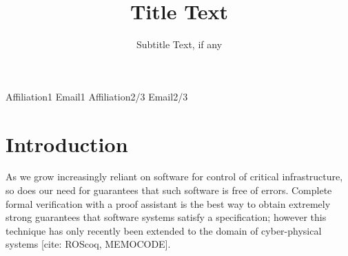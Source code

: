\documentclass{sigplanconf}
\begin{document}
\setlength{\pdfpageheight}{\paperheight}
\setlength{\pdfpagewidth}{\paperwidth}






\title{Title Text}
\subtitle{Subtitle Text, if any}

           {Affiliation1}
           {Email1}
           {Affiliation2/3}
           {Email2/3}

\maketitle





\section{Introduction}          %

As we grow increasingly reliant on software for control of critical infrastructure, so does our need for guarantees that such software is free of errors. Complete formal verification with a proof assistant is the best way to obtain extremely strong guarantees that software systems satisfy a specification; however this technique has only recently been extended to the domain of cyber-physical systems [cite: ROScoq, MEMOCODE]. %
\end{document}
